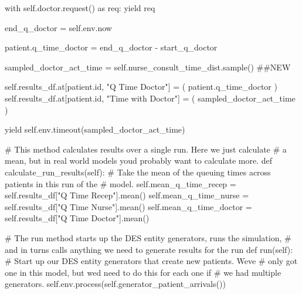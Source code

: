 \documentclass[
  letterpaper,
  DIV=11,
  numbers=noendperiod]{scrreprt}
\newenvironment{Shaded}{}{}
\newcommand{\BuiltInTok}[1]{\textcolor[rgb]{0.84,0.23,0.29}{#1}}
\newcommand{\CommentTok}[1]{\textcolor[rgb]{0.42,0.45,0.49}{#1}}
\newcommand{\ControlFlowTok}[1]{\textcolor[rgb]{0.84,0.23,0.29}{#1}}
\newcommand{\ImportTok}[1]{\textcolor[rgb]{0.01,0.18,0.38}{#1}}
\newcommand{\KeywordTok}[1]{\textcolor[rgb]{0.84,0.23,0.29}{#1}}
\newcommand{\NormalTok}[1]{\textcolor[rgb]{0.14,0.16,0.18}{#1}}
\newcommand{\OperatorTok}[1]{\textcolor[rgb]{0.14,0.16,0.18}{#1}}
\newcommand{\StringTok}[1]{\textcolor[rgb]{0.01,0.18,0.38}{#1}}
\newcommand{\VariableTok}[1]{\textcolor[rgb]{0.89,0.38,0.04}{#1}}
\begin{document}
\begin{tcolorbox}
\begin{Shaded}
\begin{Highlighting}[]
            \ControlFlowTok{with} \VariableTok{self}\NormalTok{.doctor.request() }\ImportTok{as}\NormalTok{ req:}
                \ControlFlowTok{yield}\NormalTok{ req}

\NormalTok{                end\_q\_doctor }\OperatorTok{=} \VariableTok{self}\NormalTok{.env.now}

\NormalTok{                patient.q\_time\_doctor }\OperatorTok{=}\NormalTok{ end\_q\_doctor }\OperatorTok{{-}}\NormalTok{ start\_q\_doctor}

\NormalTok{                sampled\_doctor\_act\_time }\OperatorTok{=} \VariableTok{self}\NormalTok{.nurse\_consult\_time\_dist.sample() }\CommentTok{\#\#NEW}

                \VariableTok{self}\NormalTok{.results\_df.at[patient.}\BuiltInTok{id}\NormalTok{, }\StringTok{"Q Time Doctor"}\NormalTok{] }\OperatorTok{=}\NormalTok{ (}
\NormalTok{                    patient.q\_time\_doctor}
\NormalTok{                )}
                \VariableTok{self}\NormalTok{.results\_df.at[patient.}\BuiltInTok{id}\NormalTok{, }\StringTok{"Time with Doctor"}\NormalTok{] }\OperatorTok{=}\NormalTok{ (}
\NormalTok{                    sampled\_doctor\_act\_time}
\NormalTok{                )}

                \ControlFlowTok{yield} \VariableTok{self}\NormalTok{.env.timeout(sampled\_doctor\_act\_time)}

    \CommentTok{\# This method calculates results over a single run.  Here we just calculate}
    \CommentTok{\# a mean, but in real world models you\textquotesingle{}d probably want to calculate more.}
    \KeywordTok{def}\NormalTok{ calculate\_run\_results(}\VariableTok{self}\NormalTok{):}
        \CommentTok{\# Take the mean of the queuing times across patients in this run of the}
        \CommentTok{\# model.}
        \VariableTok{self}\NormalTok{.mean\_q\_time\_recep }\OperatorTok{=} \VariableTok{self}\NormalTok{.results\_df[}\StringTok{"Q Time Recep"}\NormalTok{].mean()}
        \VariableTok{self}\NormalTok{.mean\_q\_time\_nurse }\OperatorTok{=} \VariableTok{self}\NormalTok{.results\_df[}\StringTok{"Q Time Nurse"}\NormalTok{].mean()}
        \VariableTok{self}\NormalTok{.mean\_q\_time\_doctor }\OperatorTok{=} \VariableTok{self}\NormalTok{.results\_df[}\StringTok{"Q Time Doctor"}\NormalTok{].mean()}

    \CommentTok{\# The run method starts up the DES entity generators, runs the simulation,}
    \CommentTok{\# and in turns calls anything we need to generate results for the run}
    \KeywordTok{def}\NormalTok{ run(}\VariableTok{self}\NormalTok{):}
        \CommentTok{\# Start up our DES entity generators that create new patients.  We\textquotesingle{}ve}
        \CommentTok{\# only got one in this model, but we\textquotesingle{}d need to do this for each one if}
        \CommentTok{\# we had multiple generators.}
        \VariableTok{self}\NormalTok{.env.process(}\VariableTok{self}\NormalTok{.generator\_patient\_arrivals())}


\end{Highlighting}
\end{Shaded}
\end{tcolorbox}
\end{document}
